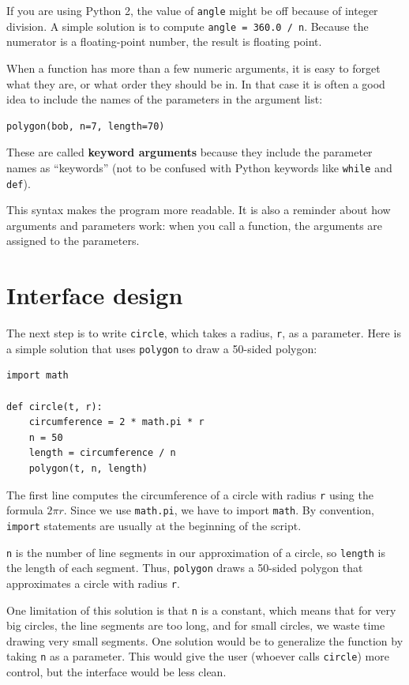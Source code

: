 \documentclass[10pt]{book}
\begin{document}
If you are using Python 2, the value of {\tt angle} might be off
because of integer division.  A simple solution is to compute
{\tt angle = 360.0 / n}.  Because the numerator is a floating-point
number, the result is floating point.

When a function has more than a few numeric arguments, it is easy to
forget what they are, or what order they should be in.  In that case
it is often a good idea to include the names of the parameters in the
argument list:

\begin{verbatim}
polygon(bob, n=7, length=70)
\end{verbatim}
%
These are called {\bf keyword arguments} because they include
the parameter names as ``keywords'' (not to be confused with
Python keywords like {\tt while} and {\tt def}).

This syntax makes the program more readable.  It is also a reminder
about how arguments and parameters work: when you call a function, the
arguments are assigned to the parameters.


\section{Interface design}

The next step is to write {\tt circle}, which takes a radius,
{\tt r}, as a parameter.  Here is a simple solution that uses
{\tt polygon} to draw a 50-sided polygon:

\begin{verbatim}
import math

def circle(t, r):
    circumference = 2 * math.pi * r
    n = 50
    length = circumference / n
    polygon(t, n, length)
\end{verbatim}
%
The first line computes the circumference of a circle with radius
{\tt r} using the formula $2 \pi r$.  Since we use {\tt math.pi}, we
have to import {\tt math}.  By convention, {\tt import} statements
are usually at the beginning of the script.

{\tt n} is the number of line segments in our approximation of a circle,
so {\tt length} is the length of each segment.  Thus, {\tt polygon}
draws a 50-sided polygon that approximates a circle with radius {\tt r}.

One limitation of this solution is that {\tt n} is a constant, which
means that for very big circles, the line segments are too long, and
for small circles, we waste time drawing very small segments.  One
solution would be to generalize the function by taking {\tt n} as
a parameter.  This would give the user (whoever calls {\tt circle})
more control, but the interface would be less clean.
\end{document}

